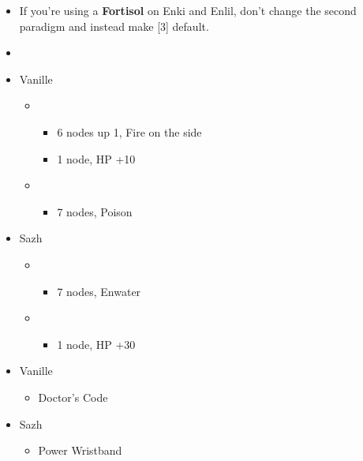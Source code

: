 \begin{menu}
		\begin{itemize}
			\paradigm
			\begin{itemize}
				\item If you're using a \textbf{Fortisol} on Enki and Enlil, don't change the second paradigm and instead make [3] default.
				\item {}%
				      {\paradigmline{\rav}{\com}{}}%
				      {\paradigmline[2]{\textit{(\sab)}}{\textit{(\syn)}}{}}%
				      {\paradigmline{\sab}{\syn}{}}%
				      {\paradigmline{\rav}{\rav}{}}%
				      {\paradigmline{[\sab]}{(\rav)}{}}%
				      {\paradigmline{[\sab]}{\com}{}}
			\end{itemize}
			\crystarium
			\begin{itemize}
				\item Vanille
				      \begin{itemize}
					      \item \rav
					            \begin{itemize}
						            \item 6 nodes up 1, Fire on the side
						            \item 1 node, HP +10
					            \end{itemize}
					      \item \sab
					            \begin{itemize}
						            \item 7 nodes, Poison
					            \end{itemize}
				      \end{itemize}
				\item Sazh
				      \begin{itemize}
					      \item \syn
					            \begin{itemize}
						            \item 7 nodes, Enwater
					            \end{itemize}
					      \item \rav
					            \begin{itemize}
						            \item 1 node, HP +30
					            \end{itemize}
				      \end{itemize}
			\end{itemize}
			\equip
			\begin{itemize}
				\item Vanille
				      \begin{itemize}
					      \item Doctor's Code
				      \end{itemize}
				\item Sazh
				      \begin{itemize}
					      \item Power Wristband
				      \end{itemize}
			\end{itemize}
		\end{itemize}
\end{menu}

